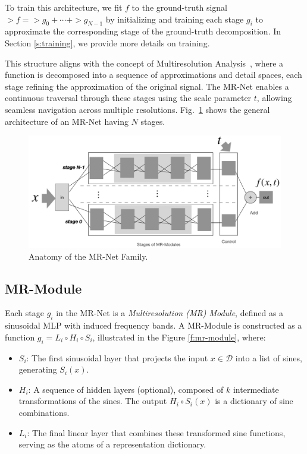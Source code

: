 To train this architecture, we fit \( f \) to the ground-truth signal \( \gt{f} = \gt{g}_0 + \cdots + \gt{g}_{N-1} \) by initializing and training each stage \( g_i \) to approximate the corresponding stage of the ground-truth decomposition. In Section \ref{s:training}, we provide more details on training.

This structure aligns with the concept of Multiresolution Analysis~\citep{mallat-mr89}, where a function is decomposed into a sequence of approximations and detail spaces, each stage refining the approximation of the original signal. The MR-Net enables a continuous traversal through these stages using the scale parameter \(t\), allowing seamless navigation across multiple resolutions. Fig.~\ref{f:mrnet-arch} shows the general architecture of an MR-Net having \(N\) stages.

\begin{figure}[!h]
\centering
\includegraphics[width=0.9\linewidth]{img/ch4/mr-net-stages-v2.png}
\caption{Anatomy of the MR-Net Family.}
\label{f:mrnet-arch}
\end{figure}


\subsection{MR-Module}
\label{s-mr-module}

Each stage \( g_i \) in the MR-Net is a \textit{Multiresolution (MR) Module}, defined as a sinusoidal MLP with induced frequency bands. A MR-Module is constructed as a function \( g_i = L_i \circ H_i \circ S_i \), illustrated in the Figure \ref{f:mr-module}, where:

\begin{itemize}
    \item \( S_i \): The first sinusoidal layer that projects the input \( x \in \mathcal{D} \) into a list of sines, generating \( S_i(x) \).
    \item \( H_i \): A sequence of hidden layers (optional), composed of \( k \) intermediate transformations of the sines. The output $H_i\circ S_i(x)$ is a dictionary of sine combinations.
    \item \( L_i \): The final linear layer that combines these transformed sine functions, serving as the atoms of a representation dictionary.
\end{itemize}


